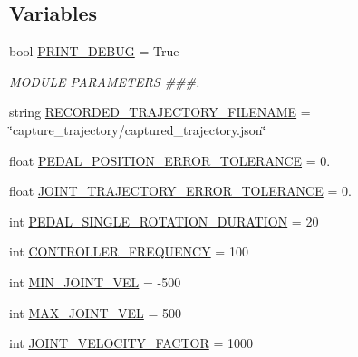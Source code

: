 \subsection*{Variables}
\begin{DoxyCompactItemize}
\item 
bool \mbox{\hyperlink{namespacepedal__simulation__interpolation_a844cd74078057e49bde15645777b304b}{P\+R\+I\+N\+T\+\_\+\+D\+E\+B\+UG}} = True
\begin{DoxyCompactList}\small\item\em M\+O\+D\+U\+LE P\+A\+R\+A\+M\+E\+T\+E\+RS \#\#\#. \end{DoxyCompactList}\item 
string \mbox{\hyperlink{namespacepedal__simulation__interpolation_a44b9acfcb3e7b06b64847b48bbcfeeb4}{R\+E\+C\+O\+R\+D\+E\+D\+\_\+\+T\+R\+A\+J\+E\+C\+T\+O\+R\+Y\+\_\+\+F\+I\+L\+E\+N\+A\+ME}} = \char`\"{}capture\+\_\+trajectory/captured\+\_\+trajectory.\+json\char`\"{}
\item 
float \mbox{\hyperlink{namespacepedal__simulation__interpolation_addfcd7d644656cc4f2a7c09eea027d9a}{P\+E\+D\+A\+L\+\_\+\+P\+O\+S\+I\+T\+I\+O\+N\+\_\+\+E\+R\+R\+O\+R\+\_\+\+T\+O\+L\+E\+R\+A\+N\+CE}} = 0.
\item 
float \mbox{\hyperlink{namespacepedal__simulation__interpolation_a64990580c32e8c389919b77c6b994965}{J\+O\+I\+N\+T\+\_\+\+T\+R\+A\+J\+E\+C\+T\+O\+R\+Y\+\_\+\+E\+R\+R\+O\+R\+\_\+\+T\+O\+L\+E\+R\+A\+N\+CE}} = 0.
\item 
int \mbox{\hyperlink{namespacepedal__simulation__interpolation_a743e18c4cd7d2f48fda3e7a20e99e4c2}{P\+E\+D\+A\+L\+\_\+\+S\+I\+N\+G\+L\+E\+\_\+\+R\+O\+T\+A\+T\+I\+O\+N\+\_\+\+D\+U\+R\+A\+T\+I\+ON}} = 20
\item 
int \mbox{\hyperlink{namespacepedal__simulation__interpolation_a561f2463c2d756fb7f8a1c3987152c2e}{C\+O\+N\+T\+R\+O\+L\+L\+E\+R\+\_\+\+F\+R\+E\+Q\+U\+E\+N\+CY}} = 100
\item 
int \mbox{\hyperlink{namespacepedal__simulation__interpolation_ab6eb9e225c26dc4ec1b4f7b43c50cae4}{M\+I\+N\+\_\+\+J\+O\+I\+N\+T\+\_\+\+V\+EL}} = -\/500
\item 
int \mbox{\hyperlink{namespacepedal__simulation__interpolation_a20755d7cab10a1f25f6d5377845d89b9}{M\+A\+X\+\_\+\+J\+O\+I\+N\+T\+\_\+\+V\+EL}} = 500
\item 
int \mbox{\hyperlink{namespacepedal__simulation__interpolation_aeaf86c6691bc01bb76d0f8d7b937719e}{J\+O\+I\+N\+T\+\_\+\+V\+E\+L\+O\+C\+I\+T\+Y\+\_\+\+F\+A\+C\+T\+OR}} = 1000
\item 

\end{DoxyCompactItemize}
